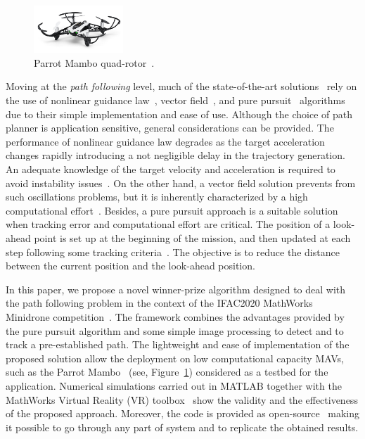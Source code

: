 \documentclass[a4paper,twocolumn,10pt]{article}
\begin{document}
    \begin{figure}
        \centering
        \includegraphics[width=0.3\textwidth]{pics/fig1_drone.jpg}
        \caption{Parrot Mambo quad-rotor~\cite{bibItem18}.}
        \label{fig:fig1Drone}
    \end{figure}

    Moving at the \textit{path following} level, much of the state-of-the-art 
    solutions~\cite{bibItem10, bibItem11} rely on the use of nonlinear guidance law~\cite{bibItem12}, vector field~\cite{bibItem13}, and pure 
    pursuit~\cite{bibItem14} algorithms due to their simple implementation and ease of use. Although the choice of path planner is application sensitive, general considerations can be provided. The performance of nonlinear guidance law degrades as the target acceleration changes rapidly introducing a not negligible delay in the trajectory generation. An adequate knowledge of the 
    target velocity and acceleration is required to avoid instability issues~\cite{bibItem12}. On the other hand, a vector field solution prevents from such oscillations problems, but it is 
    inherently characterized by a high computational effort~\cite{bibItem13}. Besides, a pure pursuit approach is a suitable solution when tracking error and computational effort are critical. The position of a look-ahead point is set up at the beginning of the mission, and then updated at 
    each step following some tracking criteria~\cite{bibItem15, bibItem16, bibItem17}. The objective is to reduce the distance between the current position and the look-ahead position.

    In this paper, we propose a novel winner-prize algorithm designed to deal with the path following problem in the context of the IFAC2020 MathWorks Minidrone 
    competition~\cite{bibItem19}. The framework combines the advantages provided by the pure pursuit algorithm and some simple image processing to detect and to track a pre-established path. The lightweight and ease of implementation of the proposed solution allow the deployment on low computational 
    capacity MAVs, such as the Parrot Mambo~\cite{bibItem18} (see, Figure~\ref{fig:fig1Drone}) considered as a testbed for the application. Numerical simulations 
    carried out in MATLAB together with the MathWorks Virtual Reality (VR) toolbox~\cite{bibItem20} show the validity and the effectiveness of the proposed approach. Moreover, the code is provided as 
    open-source~\cite{bibItem21} making it possible to go through any part of system and to replicate the obtained results. 
\end{document}
